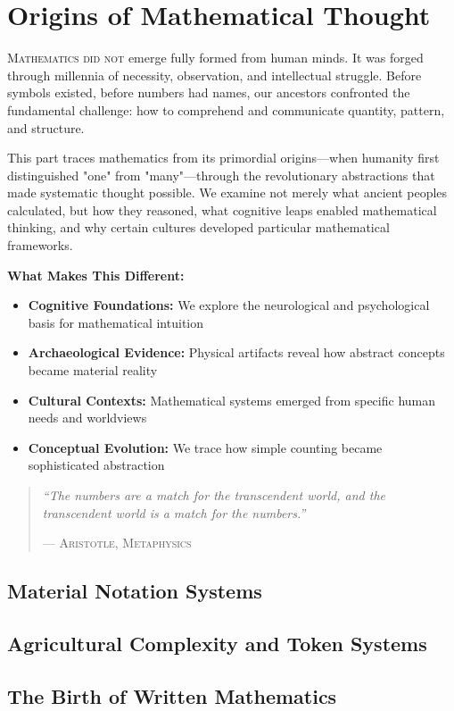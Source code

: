 \part{Origins of Mathematical Thought}
\label{part:origins}

\begin{partintro}
\lettrine[lines=3]{M}{athematics did not} emerge fully formed from human minds. It was forged through millennia of necessity, observation, and intellectual struggle. Before symbols existed, before numbers had names, our ancestors confronted the fundamental challenge: how to comprehend and communicate quantity, pattern, and structure.

This part traces mathematics from its primordial origins—when humanity first distinguished "one" from "many"—through the revolutionary abstractions that made systematic thought possible. We examine not merely what ancient peoples calculated, but how they reasoned, what cognitive leaps enabled mathematical thinking, and why certain cultures developed particular mathematical frameworks.

\vspace{1em}
\textbf{What Makes This Different:}
\begin{itemize}[noitemsep]
    \item \textbf{Cognitive Foundations:} We explore the neurological and psychological basis for mathematical intuition
    \item \textbf{Archaeological Evidence:} Physical artifacts reveal how abstract concepts became material reality
    \item \textbf{Cultural Contexts:} Mathematical systems emerged from specific human needs and worldviews
    \item \textbf{Conceptual Evolution:} We trace how simple counting became sophisticated abstraction
\end{itemize}

\begin{quote}
\textit{``The numbers are a match for the transcendent world, and the transcendent world is a match for the numbers.''}

\hfill--- \textsc{Aristotle, Metaphysics}
\end{quote}
\end{partintro}


\chapter{Material Notation Systems}
\chapter{Agricultural Complexity and Token Systems}
\chapter{The Birth of Written Mathematics}
